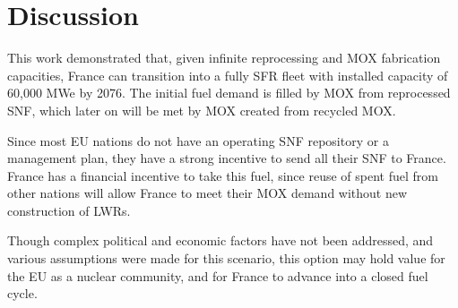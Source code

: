 \section{Discussion}
This work demonstrated that, given infinite
reprocessing and \gls{MOX} fabrication capacities,
France can transition into a fully \gls{SFR} fleet
with installed capacity of 60,000 MWe by 2076.
The initial fuel demand is filled by \gls{MOX} from
reprocessed \gls{SNF}, which later on
will be met by \gls{MOX} created from recycled \gls{MOX}.

Since most \gls{EU} nations do not have an operating \gls{SNF}
repository or a management plan, they have a strong incentive
to send all their \gls{SNF} to France. France has a financial
incentive to take this fuel, since reuse of spent fuel from
other nations will allow France to meet their MOX demand
without new construction of \glspl{LWR}.

Though complex political and economic factors have not been
addressed, and various assumptions were made for this scenario,
this option may hold value for the \gls{EU} as a nuclear community,
and for France to advance into a closed fuel cycle.
